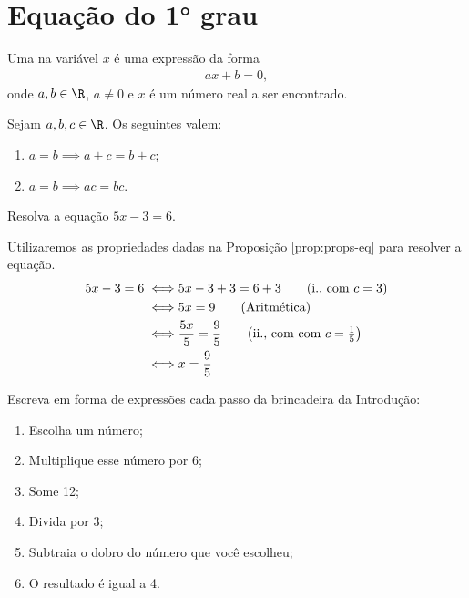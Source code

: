 \section{Equação do 1° grau}

\begin{definition}
Uma  na variável $x$ é uma expressão da forma
%
\begin{align*}
ax+b=0,
\end{align*}
%
onde $a,b \in \R$, $a \neq 0$ e $x$ é um número real a ser encontrado.
\end{definition}

\begin{proposition}[Propriedades]
\label{prop:props-eq}
Sejam $a, b, c \in \R$. Os seguintes valem:
\begin{enumerate}
  \item $a=b \implies a+c = b+c$;
  \item $a=b \implies ac = bc$.
\end{enumerate}
\end{proposition}

\begin{example}
Resolva a equação $5x-3=6$.
\end{example}

\begin{solution}
Utilizaremos as propriedades dadas na Proposição \ref{prop:props-eq} para resolver a equação.
%
\begin{align*}
5x-3=6 \iff & 5x -3+3=6+3 \tag*{$\left(\text{i., com }c = 3\right) $}\\
	   \iff & 5x =9 \tag*{(Aritmética)}\\ 
	   \iff & \frac{5x}{5} =\frac 9 5 \tag*{$\left(\text{ii., com com } c = \frac 1 5 \right) $}\\
	   \iff & x =\frac 9 5 
\end{align*}
\end{solution}

\begin{example}
Escreva em forma de expressões cada passo da brincadeira da Introdução:
\begin{enumerate}[label=\textbf{\arabic*}.]
  \item Escolha um número;
  \item Multiplique esse número por 6;
  \item Some 12;
  \item Divida por 3;
  \item Subtraia o dobro do número que você escolheu;
  \item O resultado é igual a 4.
\end{enumerate}
\end{example}

